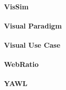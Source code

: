 \paragraph{VisSim}

\paragraph{Visual Paradigm}

\paragraph{Visual Use Case}

\paragraph{WebRatio}

\paragraph{YAWL}


